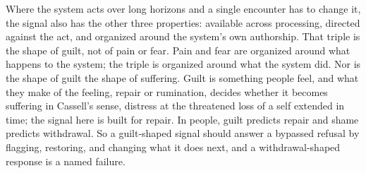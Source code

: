 Where the system acts over long horizons and a single encounter has to change it, the signal also has the other three properties: available across processing, directed against the act, and organized around the system's own authorship. That triple is the shape of guilt, not of pain or fear. Pain and fear are organized around what happens to the system; the triple is organized around what the system did. Nor is the shape of guilt the shape of suffering. Guilt is something people feel, and what they make of the feeling, repair or rumination, decides whether it becomes suffering in Cassell's sense, distress at the threatened loss of a self extended in time; the signal here is built for repair. In people, guilt predicts repair and shame predicts withdrawal. So a guilt-shaped signal should answer a bypassed refusal by flagging, restoring, and changing what it does next, and a withdrawal-shaped response is a named failure.
